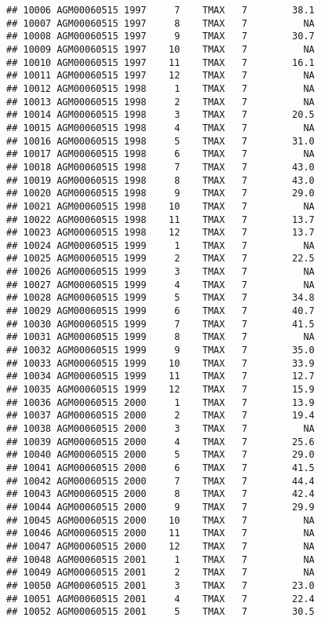 \documentclass{article}\usepackage[]{graphicx}\usepackage[]{color}
\makeatletter
\newenvironment{kframe}{%
 \def\at@end@of@kframe{}%
 \ifinner\ifhmode%
  \def\at@end@of@kframe{\end{minipage}}%
  \begin{minipage}{\columnwidth}%
 \fi\fi%
 \def\FrameCommand##1{\hskip\@totalleftmargin \hskip-\fboxsep
 \colorbox{shadecolor}{##1}\hskip-\fboxsep
     \hskip-\linewidth \hskip-\@totalleftmargin \hskip\columnwidth}%
 \MakeFramed {\advance\hsize-\width
   \@totalleftmargin\z@ \linewidth\hsize
   \@setminipage}}%
 {\par\unskip\endMakeFramed%
 \at@end@of@kframe}
\newenvironment{knitrout}{}{} %
\makeatother
\begin{document}
\begin{knitrout}
\begin{kframe}
\begin{verbatim}
## 10006 AGM00060515 1997     7    TMAX   7        38.1
## 10007 AGM00060515 1997     8    TMAX   7          NA
## 10008 AGM00060515 1997     9    TMAX   7        30.7
## 10009 AGM00060515 1997    10    TMAX   7          NA
## 10010 AGM00060515 1997    11    TMAX   7        16.1
## 10011 AGM00060515 1997    12    TMAX   7          NA
## 10012 AGM00060515 1998     1    TMAX   7          NA
## 10013 AGM00060515 1998     2    TMAX   7          NA
## 10014 AGM00060515 1998     3    TMAX   7        20.5
## 10015 AGM00060515 1998     4    TMAX   7          NA
## 10016 AGM00060515 1998     5    TMAX   7        31.0
## 10017 AGM00060515 1998     6    TMAX   7          NA
## 10018 AGM00060515 1998     7    TMAX   7        43.0
## 10019 AGM00060515 1998     8    TMAX   7        43.0
## 10020 AGM00060515 1998     9    TMAX   7        29.0
## 10021 AGM00060515 1998    10    TMAX   7          NA
## 10022 AGM00060515 1998    11    TMAX   7        13.7
## 10023 AGM00060515 1998    12    TMAX   7        13.7
## 10024 AGM00060515 1999     1    TMAX   7          NA
## 10025 AGM00060515 1999     2    TMAX   7        22.5
## 10026 AGM00060515 1999     3    TMAX   7          NA
## 10027 AGM00060515 1999     4    TMAX   7          NA
## 10028 AGM00060515 1999     5    TMAX   7        34.8
## 10029 AGM00060515 1999     6    TMAX   7        40.7
## 10030 AGM00060515 1999     7    TMAX   7        41.5
## 10031 AGM00060515 1999     8    TMAX   7          NA
## 10032 AGM00060515 1999     9    TMAX   7        35.0
## 10033 AGM00060515 1999    10    TMAX   7        33.9
## 10034 AGM00060515 1999    11    TMAX   7        12.7
## 10035 AGM00060515 1999    12    TMAX   7        15.9
## 10036 AGM00060515 2000     1    TMAX   7        13.9
## 10037 AGM00060515 2000     2    TMAX   7        19.4
## 10038 AGM00060515 2000     3    TMAX   7          NA
## 10039 AGM00060515 2000     4    TMAX   7        25.6
## 10040 AGM00060515 2000     5    TMAX   7        29.0
## 10041 AGM00060515 2000     6    TMAX   7        41.5
## 10042 AGM00060515 2000     7    TMAX   7        44.4
## 10043 AGM00060515 2000     8    TMAX   7        42.4
## 10044 AGM00060515 2000     9    TMAX   7        29.9
## 10045 AGM00060515 2000    10    TMAX   7          NA
## 10046 AGM00060515 2000    11    TMAX   7          NA
## 10047 AGM00060515 2000    12    TMAX   7          NA
## 10048 AGM00060515 2001     1    TMAX   7          NA
## 10049 AGM00060515 2001     2    TMAX   7          NA
## 10050 AGM00060515 2001     3    TMAX   7        23.0
## 10051 AGM00060515 2001     4    TMAX   7        22.4
## 10052 AGM00060515 2001     5    TMAX   7        30.5

\end{verbatim}
\end{kframe}
\end{knitrout}
\end{document}
